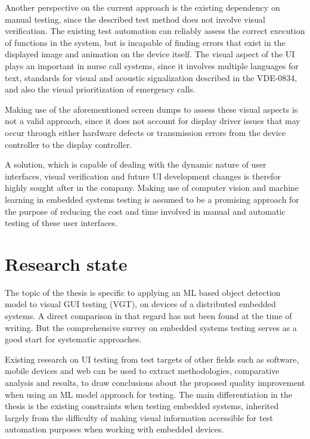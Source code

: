 \documentclass[Proposal,BIC,english,IEEE]{BASE/twbook} %
\begin{document}
Another perspective on the current approach is the existing dependency on manual testing, since the described test method does not involve visual verification. The existing test automation can reliably assess the correct execution of functions in the system, but is incapable of finding errors that exist in the displayed image and animation on the device itself.
The visual aspect of the UI plays an important in nurse call systems, since it involves multiple languages for text, standards for visual and acoustic signalization described in the VDE-0834\autocite{DINVDE08341}, and also the visual prioritization of emergency calls.

Making use of the aforementioned screen dumps to assess these visual aspects is not a valid approach, since it does not account for display driver issues that may occur through either hardware defects or transmission errors from the device controller to the display controller.

A solution, which is capable of dealing with the dynamic nature of user interfaces, visual verification and future UI development changes is therefor highly sought after in the company. Making use of computer vision and machine learning in embedded systems testing is assumed to be a promising approach for the purpose of reducing the cost and time involved in manual and automatic testing of these user interfaces.
\clearpage
\newpage
\pagestyle{plain}
\chapter{Research state}
The topic of the thesis is specific to applying an ML based object detection model to visual GUI testing (VGT), on devices of a distributed embedded systems. A direct comparison in that regard has not been found at the time of writing. But the comprehensive survey \autocite{garousiTestingEmbeddedSoftware2018} on embedded systems testing serves as a good start for systematic approaches.

Existing research on UI testing from test targets of other fields such as software, mobile devices and web can be used to extract methodologies, comparative analysis and results, to draw conclusions about the proposed quality improvement when using an ML model approach for testing. The main differentiation in the thesis is the existing constraints when testing embedded systems, inherited largely from the difficulty of making visual information accessible for test automation purposes when working with embedded devices.
\end{document}
